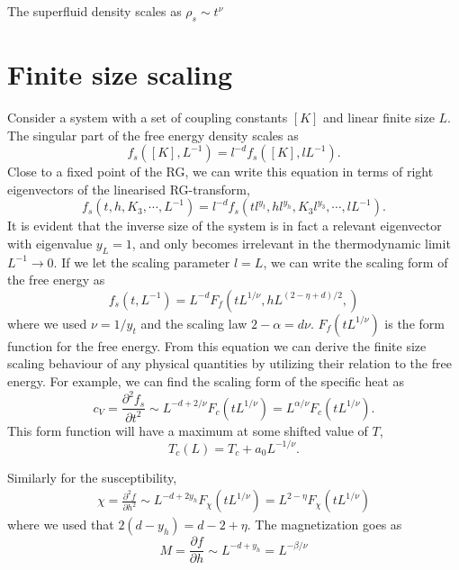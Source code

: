 The superfluid density scales as $\rho_s \sim t^{\nu} $

\section{Finite size scaling}
Consider a system with a set of coupling constants $[K]$ and linear finite size $L$. 
The singular part of the free energy density scales as
\begin{equation}
  f_s([K],L^{-1}) = l^{-d}f_s([K],lL^{-1}).
  \label{}
\end{equation}
Close to a fixed point of the RG, we can write this equation in terms of right eigenvectors of the linearised RG-transform,
\begin{equation}
  f_s(t,h,K_3,\cdots,L^{-1}) = l^{-d}f_s(tl^{y_t},hl^{y_h},K_3 l^{y_3},\cdots,lL^{-1}).
  \label{}
\end{equation}
It is evident that the inverse size of the system is in fact a relevant eigenvector with eigenvalue $y_L = 1$, and only becomes irrelevant in the thermodynamic limit $L^{-1}\rightarrow 0$.
If we let the scaling parameter $l = L$, we can write the scaling form of the free energy as
\begin{equation}
  f_s(t,L^{-1}) = L^{-d} F_f(t L^{1/\nu},h L^{(2-\eta +d)/2},)
  \label{}
\end{equation}
where we used $\nu = 1/y_t$ and the scaling law $2 -\alpha = d\nu$.
$F_f(tL^{1/\nu})$ is the form function for the free energy.
From this equation we can derive the finite size scaling behaviour of any physical quantities by utilizing their relation to the free energy. 
For example, we can find the scaling form of the specific heat as
\begin{equation}
  c_V = \frac{\partial ^2 f_s}{\partial t^2} \sim L^{-d +2/\nu}F_{c}(tL^{1/\nu}) = L^{\alpha/\nu} F_{c}(tL^{1/\nu}).
  \label{}
\end{equation}
This form function will have a maximum at some shifted value of $T$, 
\begin{equation}
  T_c(L) = T_c +  a_0 L^{-1/\nu}.
  \label{}
\end{equation}


Similarly for the susceptibility,
\begin{align}
  \chi = \frac{\partial^2 f}{\partial h^2}
  \sim L^{-d +2y_h}F_{\chi}(tL^{1/\nu}) = L^{2-\eta}F_{\chi}(tL^{1/\nu})
  \label{}
\end{align}
where we used that $ 2(d-y_h) = d -2 +\eta$.
The magnetization goes as
\begin{equation}
  M = \frac{\partial f}{\partial h} \sim L^{-d + y_h} = L^{-\beta/\nu}
  \label{}
\end{equation}


